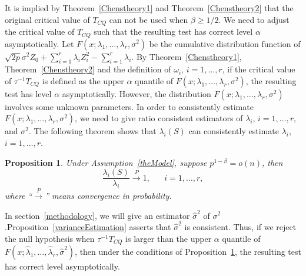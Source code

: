 \documentclass[review]{elsarticle}
\theoremstyle{plain}
\newtheorem{theorem}{\quad\quad Theorem}
\newtheorem{proposition}{\quad\quad Proposition}
\theoremstyle{definition}
\theoremstyle{remark}
\begin{document}

It is implied by Theorem~\ref{Chenstheory1} and Theorem~\ref{Chenstheory2} that the original critical value of $T_{CQ}$ can not be used when $\beta\geq 1/2$.
We need to adjust the critical value of $T_{CQ}$ such that the resulting test has correct level $\alpha$ asymptotically.
Let $F(x;\lambda_1,\ldots,\lambda_r,\sigma^2)$ be the cumulative distribution function of 
$
\sqrt{2p}\sigma^2 Z_0
+
        \sum_{i=1}^r \lambda_i Z_i^2
            -
        \sum_{i=1}^r \lambda_i
        $.
By Theorem~\ref{Chenstheory1}, Theorem~\ref{Chenstheory2} and the definition of $\omega_i$, $i=1,\ldots,r$, if the critical value of $\tau^{-1}T_{CQ}$ is defined as the upper $\alpha$ quantile of
$F(x;\lambda_1,\ldots,\lambda_r,\sigma^2)$, the resulting test has level $\alpha$ asymptotically.
        However, the distribution $F(x;\lambda_1,\ldots,\lambda_r,\sigma^2)$ involves some unknown parameters.
In order to consistently estimate $F(x;\lambda_1,\ldots,\lambda_r,\sigma^2)$, we need to give ratio consistent estimators of $\lambda_i$, $i=1,\ldots,r$, and $\sigma^2$.
The following theorem shows that  $\lambda_i(S)$ can consistently estimate $\lambda_i$, $i=1,\ldots,r$.
\begin{proposition}\label{eigenconsis}
    Under Assumption~\ref{theModel}, suppose $p^{1-\beta}=o(n)$, then
    $$
    \frac{\lambda_i(S)}{\lambda_i}\xrightarrow{P}1,\quad\text{ $i=1,\ldots,r$},
    $$
    where ``$\xrightarrow{P}$'' means convergence in probability.
\end{proposition}
In section~\ref{methodology}, we will give an estimator $\hat{\sigma}^2$ of $\sigma^2$.Proposition~\ref{varianceEstimation} asserts that $\hat{\sigma}^2$ is consistent.
Thus, if we reject the null hypothesis when
$\tau^{-1}{T_{CQ}}$ is larger than the upper $\alpha$ quantile of $F(x;\hat{\lambda}_1,\ldots,\hat{\lambda}_r,\hat{\sigma}^2)$, then under the conditions of Proposition~\ref{eigenconsis}, the resulting test has correct level asymptotically.
\end{document}
